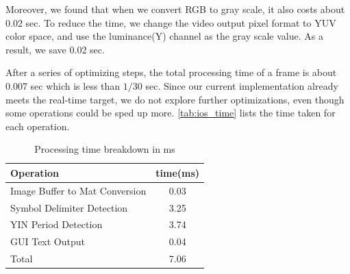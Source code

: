 Moreover, we found that when we convert RGB to gray scale, it also costs about 0.02 sec. To reduce the time, we change the video output pixel format to YUV color space, and use the luminance(Y) channel as the gray scale value. As a result, we save 0.02 sec.

After a series of optimizing steps, the total processing time of a frame is about 0.007 sec which is less than $1/30$ sec. Since our current implementation already meets the real-time target, we do not explore further optimizations, even though some operations could be sped up more.
 \autoref{tab:ios_time} lists the time taken for each operation.

\begin{table}[!htb]
\centering
\caption{Processing time breakdown in ms}
        \begin{tabular}{lc}
        \hline Operation & time(ms) \\ \hline \hline
        Image Buffer to Mat Conversion & 0.03 \\
        Symbol Delimiter Detection & 3.25 \\
        YIN Period Detection & 3.74 \\
        GUI Text Output & 0.04 \\
        \hline
        Total & 7.06 \\
        \hline
        \end{tabular}
        \label{tab:ios_time}
\end{table}